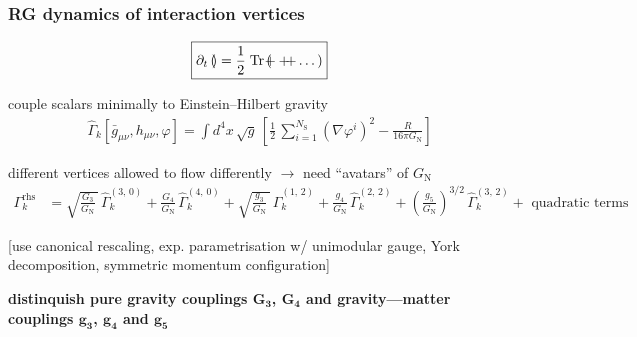 \documentclass[]{beamer}  %
\newcommand\NS{ N_{\scriptscriptstyle{\mathrm{S}}} }
\newcommand\GNewton{ G_{\scriptscriptstyle{\mathrm{N}}}{} }
\begin{document}
\begin{frame}
  \frametitle{RG dynamics of interaction vertices}

  \begin{align*}
    \boxed{
      \partial_t
      \left(
        \hspace{-5pt}
        
        \hspace{2pt}
      \right)
      =
      \frac12 \;
      \mathrm{Tr}
      \left(
        \hspace{-5pt}
        
        + 
        +
        
        \hspace{-5pt}
        + \dots
      \right)
    }
  \end{align*}

  couple scalars minimally to Einstein--Hilbert gravity
  \begin{align*}
    \hat \Gamma_k[\bar g_{\mu\nu}, h_{\mu\nu}, \varphi] = \int d^4x \, \sqrt{g} \,
    \left[
      \frac{1}{2} \, \sum_{i=1}^{\NS} \left( \nabla\varphi^i \right)^2
      - \frac{R}{16 \pi \GNewton}
    \right]
  \end{align*}

  different vertices allowed to flow differently $\rightarrow$ need ``avatars'' of $\GNewton$
  \begin{align*}
    \Gamma_k^\mathrm{rhs} &=
    \sqrt{ \frac{G_3}{\GNewton} \, } \, \hat\Gamma^{(3,\,0)}_k
    + \frac{G_4}{\GNewton} \, \hat\Gamma^{(4,\,0)}_k
    + \sqrt{ \frac{g_3}{\GNewton} \, } \, \hat\Gamma^{(1,\,2)}_k
    + \frac{g_4}{ \GNewton} \, \hat\Gamma^{(2,\,2)}_k
    + \left(\frac{g_5}{ \GNewton}\right)^{3/2} \, \hat\Gamma^{(3,\,2)}_k
    + \mbox{ quadratic terms }
  \end{align*}

  \vspace{-5pt}
  \fontsize{6pt}{7.2}\selectfont
  \hfill [use canonical rescaling, exp. parametrisation w/ unimodular gauge,
  York decomposition, symmetric momentum configuration]

  \vspace{15pt}
  \fontsize{8pt}{7.2}\selectfont
  \begin{center}
    \textbf{
      distinquish pure gravity couplings $\mathbf{G_3}$, $\mathbf{G_4}$ and gravity---matter couplings
      $\mathbf{g_3}$, $\mathbf{g_4}$ and $\mathbf{g_5}$
    }
  \end{center}
\end{frame}
\end{document}
